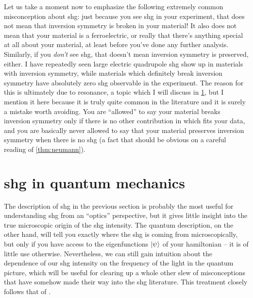 Let us take a moment now to emphasize the following extremely common misconception about \gls{shg}: just because you see \gls{shg} in your experiment, that does not mean that inversion symmetry is broken in your material!
It also does not mean that your material is a ferroelectric, or really that there's anything special at all about your material, at least before you've done any further analysis.
Similarly, if you \emph{don't} see \gls{shg}, that doesn't mean inversion symmetry is preserved, either.
I have repeatedly seen large electric quadrupole \gls{shg} show up in materials with inversion symmetry, while materials which definitely break inversion symmetry have absolutely zero \gls{shg} observable in the experiment.
The reason for this is ultimately due to resonance, a topic which I will discuss in \cref{sec:resonance}, but I mention it here because it is truly quite common in the literature and it is surely a mistake worth avoiding.
You are ``allowed'' to say your material breaks inversion symmetry only if there is no other contribution in  which fits your data, and you are basically never allowed to say that your material preserves inversion symmetry when there is no \gls{shg} (a fact that should be obvious on a careful reading of \cref{thm:neumann}).

\section{\Gls{shg} in quantum mechanics}\label{sec:resonance}

The description of \gls{shg} in the previous section is probably the most useful for understanding \gls{shg} from an ``optics'' perspective, but it gives little insight into the true microscopic origin of the \gls{shg} intensity.
The quantum description, on the other hand, will tell you exactly where the \gls{shg} is coming from microscopically, but only if you have access to the eigenfunctions $\ket{\psi}$ of your hamiltonian -- it is of little use otherwise.
Nevertheless, we can still gain intuition about the dependence of our \gls{shg} intensity on the frequency of the light in the quantum picture, which will be useful for clearing up a whole other slew of misconceptions that have somehow made their way into the \gls{shg} literature.
This treatment closely follows that of \citet{boyd}.

